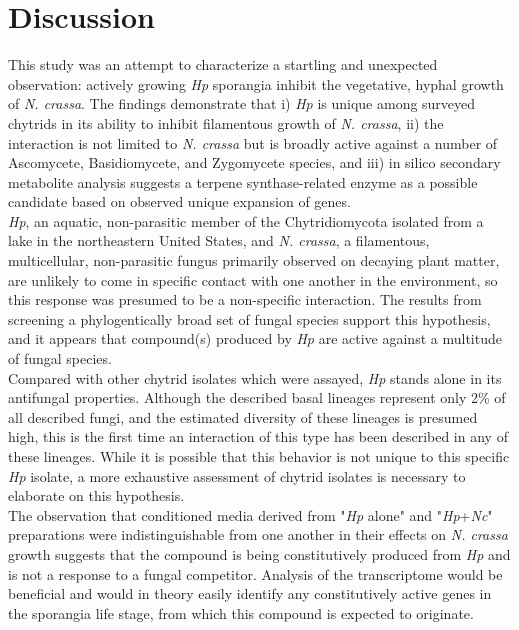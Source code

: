 \section{Discussion}
This study was an attempt to characterize a startling and unexpected observation: actively growing \textit{Hp} sporangia inhibit the vegetative, hyphal growth of \textit{N. crassa}. The findings demonstrate that i) \textit{Hp} is unique among surveyed chytrids in its ability to inhibit filamentous growth of \textit{N. crassa}, ii) the interaction is not limited to \textit{N. crassa} but is broadly active against a number of Ascomycete, Basidiomycete, and Zygomycete species, and iii) in silico secondary metabolite analysis suggests a terpene synthase-related enzyme as a possible candidate based on observed unique expansion of genes.\\
\indent \textit{Hp}, an aquatic, non-parasitic member of the Chytridiomycota isolated from a lake in the northeastern United States, and \textit{N. crassa}, a filamentous, multicellular, non-parasitic fungus primarily observed on decaying plant matter, are unlikely to come in specific contact with one another in the environment, so this response was presumed to be a non-specific interaction. The results from screening a phylogentically broad set of fungal species support this hypothesis, and it appears that compound(s) produced by \textit{Hp} are active against a multitude of fungal species.\\
\indent Compared with other chytrid isolates which were assayed, \textit{Hp} stands alone in its antifungal properties. Although the described basal lineages represent only 2\% of all described fungi, and the estimated diversity of these lineages is presumed high, this is the first time an interaction of this type has been described in any of these lineages. While it is possible that this behavior is not unique to this specific \textit{Hp} isolate, a more exhaustive assessment of chytrid isolates is necessary to elaborate on this hypothesis.\\
\indent The observation that conditioned media derived from "\textit{Hp} alone" and "\textit{Hp}+\textit{Nc}" preparations were indistinguishable from one another in their effects on \textit{N. crassa} growth suggests that the compound is being constitutively produced from \textit{Hp} and is not a response to a fungal competitor. Analysis of the transcriptome would be beneficial and would in theory easily identify any constitutively active genes in the sporangia life stage, from which this compound is expected to originate.\\

